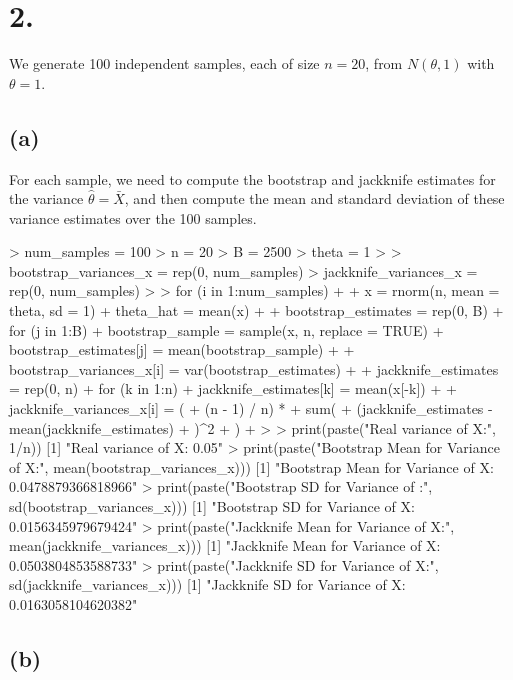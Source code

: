 \documentclass{article}
\begin{document}
{\Large 

\section*{2.}

We generate 100 independent samples, each of size \(n = 20\), from
\(N(\theta, 1)\) with \(\theta = 1\). 

\subsection*{(a)}

For each sample, we need to compute the bootstrap and jackknife estimates for the variance \(\hat{\theta} = \bar{X}\), and then compute the mean and standard deviation of these variance estimates over the 100 samples. 
\begin{spverbatim}
> num_samples = 100
> n = 20
> B = 2500
> theta = 1
> 
> bootstrap_variances_x = rep(0, num_samples)
> jackknife_variances_x = rep(0, num_samples)
> 
> for (i in 1:num_samples) {
+   
+   x = rnorm(n, mean = theta, sd = 1)
+   theta_hat = mean(x)
+   
+   bootstrap_estimates = rep(0, B)
+   for (j in 1:B) {
+     bootstrap_sample = sample(x, n, replace = TRUE)
+     bootstrap_estimates[j] = mean(bootstrap_sample)
+   }
+   bootstrap_variances_x[i] = var(bootstrap_estimates)
+ 
+   jackknife_estimates = rep(0, n)
+   for (k in 1:n) {
+     jackknife_estimates[k] = mean(x[-k])
+   }
+   jackknife_variances_x[i] = (
+     (n - 1) / n) * 
+     sum(
+       (jackknife_estimates - mean(jackknife_estimates)
+     )^2
+   )
+ }
> 
> print(paste("Real variance of X:", 1/n))
[1] "Real variance of X: 0.05"
> print(paste("Bootstrap Mean for Variance of X:", mean(bootstrap_variances_x)))
[1] "Bootstrap Mean for Variance of X: 0.0478879366818966"
> print(paste("Bootstrap SD for Variance of :", sd(bootstrap_variances_x)))
[1] "Bootstrap SD for Variance of X: 0.0156345979679424"
> print(paste("Jackknife Mean for Variance of X:", mean(jackknife_variances_x)))
[1] "Jackknife Mean for Variance of X: 0.0503804853588733"
> print(paste("Jackknife SD for Variance of X:", sd(jackknife_variances_x)))
[1] "Jackknife SD for Variance of X: 0.0163058104620382"
\end{spverbatim}

\subsection*{(b)}

}
\end{document}
